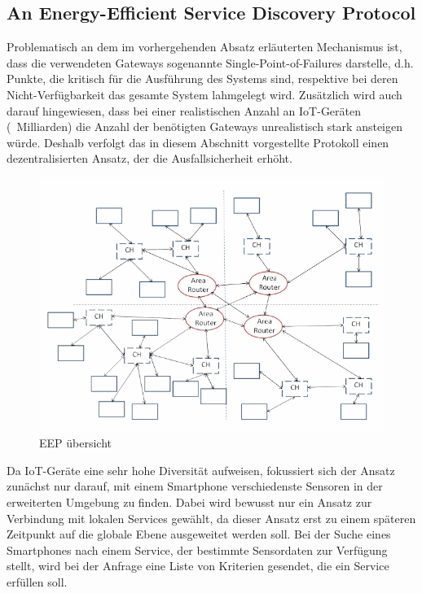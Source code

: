 \documentclass[conference,compsoc]{IEEEtran}
\begin{document}
\subsection{An Energy-Efficient Service Discovery Protocol}

Problematisch an dem im vorhergehenden Absatz erläuterten Mechanismus ist, dass die verwendeten Gateways sogenannte Single-Point-of-Failures darstelle, d.h. Punkte, die kritisch für die Ausführung des Systems sind, respektive bei deren Nicht-Verfügbarkeit das gesamte System lahmgelegt wird. Zusätzlich wird auch darauf hingewiesen, dass bei einer realistischen Anzahl an IoT-Geräten (~Milliarden) die Anzahl der benötigten Gateways unrealistisch stark ansteigen würde. Deshalb verfolgt das in diesem Abschnitt vorgestellte Protokoll einen dezentralisierten Ansatz, der die Ausfallsicherheit erhöht.

\begin{figure}
\label{EEPBild}
\includegraphics[scale=0.45]{EEP.png}
EEP übersicht
\end{figure}


Da IoT-Geräte eine sehr hohe Diversität aufweisen, fokussiert sich der Ansatz zunächst nur darauf, mit einem Smartphone verschiedenste Sensoren in der erweiterten Umgebung zu finden. Dabei wird bewusst nur ein Ansatz zur Verbindung mit lokalen Services gewählt, da dieser Ansatz erst zu einem späteren Zeitpunkt auf die globale Ebene ausgeweitet werden soll. Bei der Suche eines Smartphones nach einem Service, der bestimmte Sensordaten zur Verfügung stellt, wird bei der Anfrage eine Liste von Kriterien gesendet, die ein Service erfüllen soll.
\end{document}
